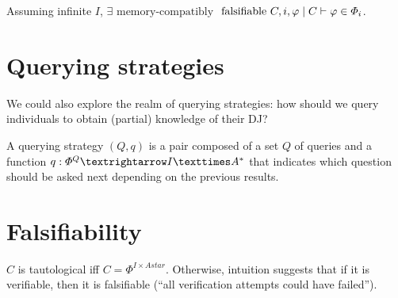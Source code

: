 \documentclass[version=3.21, pagesize, twoside=off, bibliography=totoc, DIV=calc, fontsize=12pt, a4paper]{scrartcl}
\begin{document}
\begin{theorem}[Observability of DJ]
	Assuming infinite $I$, $\exists \text{ memory-compatibly}$ $\text{ falsifiable } C, i, \phi \suchthat C \vdash \phi \in \Phi_i$.
\end{theorem}

\section{Querying strategies}
We could also explore the realm of querying strategies: how should we query individuals to obtain (partial) knowledge of their DJ?

\begin{definition}
	A querying strategy $(Q, q)$ is a pair composed of a set $Q$ of queries and a function $q: \Phi^Q → I × \Astar$ that indicates which question should be asked next depending on the previous results.
\end{definition}

\appendix
\section{Falsifiability}
$C$ is tautological iff $C = \Phi^{I × Astar}$.
Otherwise, intuition suggests that if it is verifiable, then it is falsifiable (“all verification attempts could have failed”).

%
\end{document}
